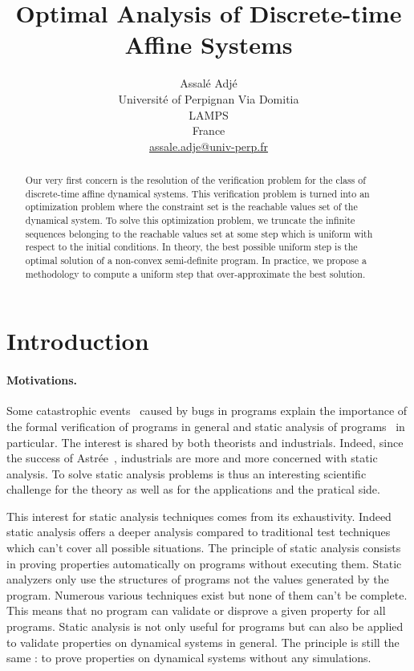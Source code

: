 \documentclass[10pt]{article}
\title{Optimal Analysis of Discrete-time Affine Systems}
\author{Assalé Adjé\\
Université of Perpignan Via Domitia\\
LAMPS\\
France\\
\url{assale.adje@univ-perp.fr}
}
\date{}%
\begin{document}
\maketitle
\begin{abstract}
 Our very first concern is the resolution of the verification problem for the class of discrete-time affine dynamical systems. This verification problem is turned into an optimization problem where the constraint set is the reachable values set of the dynamical system. To solve this optimization problem, we truncate the infinite sequences belonging to the reachable values set at some step which is uniform with respect to the initial conditions. In theory, the best possible uniform step is the optimal solution of a non-convex semi-definite program. In practice,  we propose a methodology to compute a uniform step that over-approximate the best solution.
\end{abstract}

\section{Introduction}
\paragraph{Motivations.}
Some catastrophic events~\cite{johnson2005natural,mcquaid2012software} caused by bugs in programs explain the importance of the formal verification of programs in general and static analysis of programs~\cite{cousot2010gentle} in particular. The interest is shared by both theorists and industrials. Indeed, since the success of Astrée~\cite{delmas2007astree,souyris2007experimental,bouissou2009space}, industrials are  more and more concerned with static analysis.  To solve static analysis problems is thus an interesting scientific challenge for the theory as well as for the applications and the pratical  side.   

This interest for static analysis techniques comes from its exhaustivity. Indeed static analysis offers a deeper analysis compared to traditional test techniques which can't cover all possible situations. The principle of static analysis consists in proving properties automatically on programs without executing them. Static analyzers only use the structures of programs not the values generated by the program.  Numerous various techniques exist but none of them can't be complete. This means that no program can validate or disprove a given property for all programs. Static analysis is not only useful for programs but can also be applied to validate properties on dynamical systems in general. The principle is still the same : to prove properties on dynamical systems without any simulations.
\end{document}
